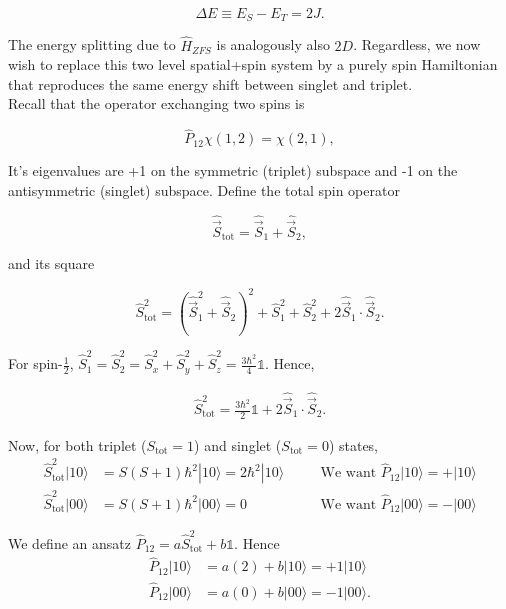 \documentclass[svgnames]{article}
\begin{document}
\[
\Delta E \equiv E_S - E_T = 2J. 
\] \vspace{3px}


The energy splitting due to $\hat{H}_{ZFS}$ is analogously also $2D$.
Regardless, we now wish to replace this two level spatial+spin system by a
purely spin Hamiltonian that reproduces the same energy shift between singlet
and triplet.  \\ 

Recall that the operator exchanging two spins is 

\[
    \hat{P}_{12} \chi(1, 2) = \chi(2, 1), 
\]

It's eigenvalues are +1 on the symmetric (triplet) subspace and -1 on the
antisymmetric (singlet) subspace. Define the total spin operator 

\[
\hat{\vec{S}}_\text{tot} = \hat{\vec{S}}_1 + \hat{\vec{S}}_2, 
\] 

and its square 

\[
\hat{S}^2_\text{tot} = (\hat{\vec{S}}_1^2 + \hat{\vec{S}}_2)^2 + \hat{S}_1^2 +
 \hat{S}_2^2 + 2 \hat{\vec{S}}_1 \cdot \hat{\vec{S}}_2.  
\] \vspace{3px}

For spin-$\frac{1}{2}$, $\hat{S}_1^2 = \hat{S}_2^2 = \hat{S}_x^2 + \hat{S}_y^2 +
\hat{S}_z^2 = \frac{3\hbar^2}{4}\mathds{1}$. Hence, 

\begin{align} \label{Stot}
    \hat{S}_\text{tot}^2 = \frac{3\hbar^2}{2}\mathds{1} + 2 \hat{\vec{S}}_1
    \cdot \hat{\vec{S}}_2. 
\end{align} \vspace{3px}

Now, for both triplet ($S_\text{tot}=1$) and singlet ($S_\text{tot}=0$) states, 
\begin{align*}
    \hat{S}_\text{tot}^2 |10\rangle  &= S(S+1)\hbar^2|10\rangle =
    2\hbar^2|10\rangle \quad &&\text{We want $\hat{P}_{12} |10\rangle =
    +|10\rangle$}\\
    \hat{S}_\text{tot}^2 |00\rangle &= S(S+1)\hbar^2|00\rangle = 0 \quad
                                    &&\text{We want $\hat{P}_{12}|00\rangle = -|00\rangle$} 
\end{align*}

We define an ansatz $\hat{P}_{12} = a \hat{S}_\text{tot}^2 + b\mathds{1}$. Hence 
\begin{align*}
    \hat{P}_{12} |10\rangle &= a(2) + b |10\rangle = +1 |10\rangle \\ 
    \hat{P}_{12} |00\rangle &= a(0) + b |00\rangle = -1 |00\rangle. 
\end{align*} 
\end{document}
